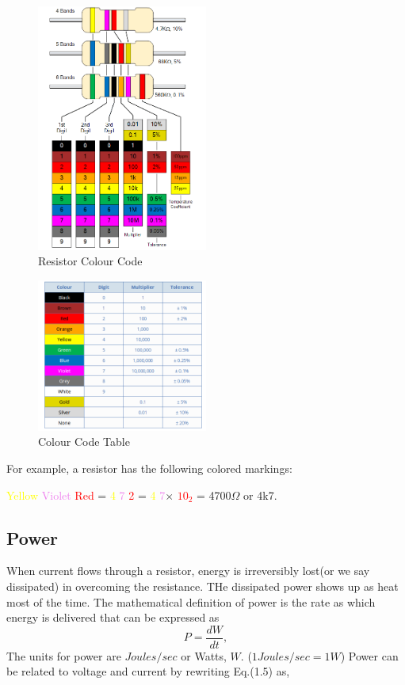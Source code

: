 \documentclass[a4 paper]{article}
\newcommand{\red}[1]{\textcolor{red}{#1}}
\newcommand{\yellow}[1]{\textcolor{yellow}{#1}}
\newcommand{\violet}[1]{\textcolor{violet}{#1}}
\numberwithin{equation}{section}
\newcommand{\0}{\mathbf{0}}
\begin{document}
\begin{figure}[!ht]
  \caption{Resistor Colour Code}
  \centering
  \includegraphics[width=0.5\textwidth]{./images/ColourCode1}
\end{figure}

\vspace{8 mm}

\begin{figure}[!ht]
  \caption{Colour Code Table}
  \centering
  \includegraphics[width=0.5\textwidth]{./images/ColourCode2}
\end{figure}
For example, a resistor has the following colored markings: \newline
\centerline{\yellow{Yellow} \violet{Violet} \red{Red} = \yellow{4} \violet{7} \red{2} = \yellow{4} \violet{7}$\times$ \red{$10_2$} = 4700$\Omega$ or 4k7.
}

\subsection{Power}
When current flows through a resistor, energy is irreversibly lost(or we say dissipated) in overcoming the resistance. THe dissipated power shows up as heat most of the time. The mathematical definition of power is the rate as which energy is delivered that can be expressed as
\begin{equation}
P = \frac{dW}{dt},
\end{equation}
The units for power are $Joules/sec$ or Watts, $W$. ($1 Joules/sec = 1 W$) 
Power can be related to voltage and current by rewriting Eq.(1.5) as, 
\end{document}
